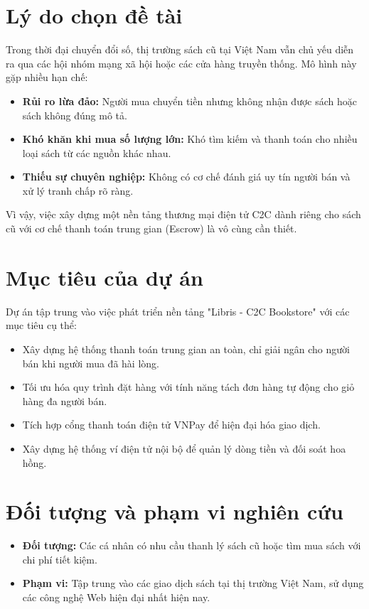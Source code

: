 \documentclass[../main.tex]{subfiles}
\begin{document}
\section{Lý do chọn đề tài}
Trong thời đại chuyển đổi số, thị trường sách cũ tại Việt Nam vẫn chủ yếu diễn ra qua các hội nhóm mạng xã hội hoặc các cửa hàng truyền thống. Mô hình này gặp nhiều hạn chế:
\begin{itemize}
    \item \textbf{Rủi ro lừa đảo:} Người mua chuyển tiền nhưng không nhận được sách hoặc sách không đúng mô tả.
    \item \textbf{Khó khăn khi mua số lượng lớn:} Khó tìm kiếm và thanh toán cho nhiều loại sách từ các nguồn khác nhau.
    \item \textbf{Thiếu sự chuyên nghiệp:} Không có cơ chế đánh giá uy tín người bán và xử lý tranh chấp rõ ràng.
\end{itemize}
Vì vậy, việc xây dựng một nền tảng thương mại điện tử C2C dành riêng cho sách cũ với cơ chế thanh toán trung gian (Escrow) là vô cùng cần thiết.

\section{Mục tiêu của dự án}
Dự án tập trung vào việc phát triển nền tảng "Libris - C2C Bookstore" với các mục tiêu cụ thể:
\begin{itemize}
    \item Xây dựng hệ thống thanh toán trung gian an toàn, chỉ giải ngân cho người bán khi người mua đã hài lòng.
    \item Tối ưu hóa quy trình đặt hàng với tính năng tách đơn hàng tự động cho giỏ hàng đa người bán.
    \item Tích hợp cổng thanh toán điện tử VNPay để hiện đại hóa giao dịch.
    \item Xây dựng hệ thống ví điện tử nội bộ để quản lý dòng tiền và đối soát hoa hồng.
\end{itemize}

\section{Đối tượng và phạm vi nghiên cứu}
\begin{itemize}
    \item \textbf{Đối tượng:} Các cá nhân có nhu cầu thanh lý sách cũ hoặc tìm mua sách với chi phí tiết kiệm.
    \item \textbf{Phạm vi:} Tập trung vào các giao dịch sách tại thị trường Việt Nam, sử dụng các công nghệ Web hiện đại nhất hiện nay.
\end{itemize}
\end{document}
